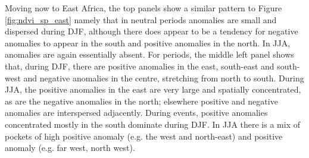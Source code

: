 Moving now to East Africa, the top panels show a similar pattern to
Figure \ref{fig:ndvi_sp_east} namely that in neutral periods anomalies
are small and dispersed during DJF, although there does appear to be a
tendency for negative anomalies to appear in the south and positive
anomalies in the north. In JJA, anomalies are again essentially
absent. For \elnino{} periods, the middle left panel shows that, during
DJF, there are positive anomalies in the east, south-east and
south-west and negative anomalies in the centre, stretching from north
to south. During JJA, the positive anomalies in the east are very
large and spatially concentrated, as are the negative anomalies in the
north; elsewhere positive and negative anomalies are interspersed
adjacently. During \nina{} events, positive anomalies concentrated
mostly in the south dominate during DJF. In JJA there is a mix of
pockets of high positive anomaly (e.g. the west and north-east) and
positive anomaly (e.g. far west, north west).
